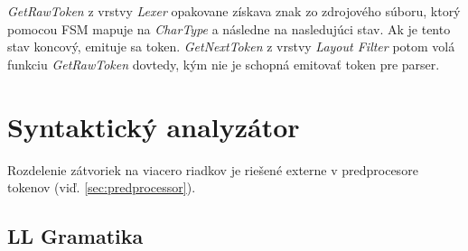 \documentclass[11pt,a4paper]{article}
\begin{document}
  \textit{GetRawToken} z vrstvy \textit{Lexer} opakovane získava znak zo zdrojového súboru, ktorý pomocou FSM mapuje na
  \textit{CharType} a následne na nasledujúci stav. Ak je tento stav koncový, emituje sa
  token. \textit{GetNextToken} z vrstvy \textit{Layout Filter} potom volá
  funkciu \textit{GetRawToken} dovtedy,
  kým nie je schopná emitovať token pre parser.


  \clearpage
  \section{Syntaktický analyzátor}

  Rozdelenie zátvoriek na viacero riadkov je riešené externe v predprocesore
  tokenov (viď. \ref{sec:predprocessor}).

  \subsection{LL Gramatika}
\end{document}
